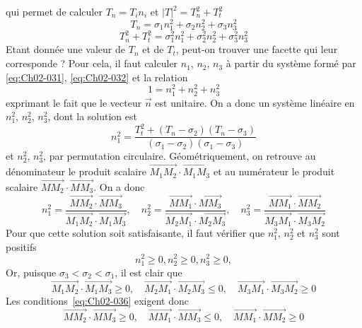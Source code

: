 qui permet de calculer $T_n = T_i n_i$ et $|T|^2 = T_n^2 + T_t^2$
\begin{equation}
    T_n = \sigma_1 n_1^2 + \sigma_2 n_2^2 + \sigma_3 n_3^2
    \label{eq:Ch02-031}
\end{equation}
\begin{equation}
    T_n^2 + T_t^2 = \sigma_1^2 n_1^2 + \sigma_2^2 n_2^2 + \sigma_3^2 n_3^2
    \label{eq:Ch02-032}
\end{equation}
Etant donnée une valeur de $T_n$ et de $T_t$, peut-on trouver une facette qui leur corresponde ?
Pour cela, il faut calculer $n_1$, $n_2$, $n_3$ à partir du système formé par \eqref{eq:Ch02-031}, \eqref{eq:Ch02-032} et la relation 
\begin{equation}
    1 = n_1^2 + n_2^2 + n_3^2
    \label{eq:Ch02-033}
\end{equation}
exprimant le fait que le vecteur $\vec{n}$ est unitaire.
On a donc un système linéaire en $n_1^2$, $n_2^2$, $n_3^2$, dont la solution est 
\begin{equation}
    n_1^2 = \frac{T_t^2 + \left( T_n - \sigma_2 \right)\left( T_n - \sigma_3 \right)}{\left( \sigma_1 - \sigma_2 \right)\left( \sigma_1 - \sigma_3 \right)}
    \label{eq:Ch02-034}
\end{equation}
et $n_2^2$, $n_3^2$, par permutation circulaire.
Géométriquement, on retrouve au dénominateur le produit scalaire $\vec{M_1M_2}\cdot\vec{M_1M_3}$ et au numérateur le produit scalaire $\vec{MM_2}\cdot \vec{MM_3}$.
On a donc 
\begin{equation}
    n_1^2 = \frac{\vec{MM_2} \cdot \vec{MM_3}}{\vec{M_1M_2} \cdot \vec{M_1M_3}},\quad n_2^2 = \frac{\vec{MM_1} \cdot \vec{MM_3}}{\vec{M_2M_1} \cdot \vec{M_2M_3}},\quad n_3^2 = \frac{\vec{MM_1} \cdot \vec{MM_2}}{\vec{M_3M_1} \cdot \vec{M_3M_2}}
    \label{eq:Ch02-035}
\end{equation}
Pour que cette solution soit satisfaisante, il faut vérifier que $n_1^2$, $n_2^2$ et $n_3^2$ sont positifs 
\begin{equation}
    n_1^2 \geq 0, n_2^2 \geq 0, n_3^2 \geq 0, 
    \label{eq:Ch02-036}
\end{equation}
Or, puisque $\sigma_3 < \sigma_2 < \sigma_1$, il est clair que
\begin{equation}
    \vec{M_1M_2} \cdot \vec{M_1M_3} \geq 0, \quad \vec{M_2M_1} \cdot \vec{M_2M_3} \leq 0, \quad \vec{M_3M_1} \cdot \vec{M_3M_2} \geq 0
    \label{eq:Ch02-037}
\end{equation}
Les conditions~\eqref{eq:Ch02-036} exigent donc 
\begin{equation}
    \vec{MM_2} \cdot \vec{MM_3} \geq 0, \quad \vec{MM_1} \cdot \vec{MM_3} \leq 0, \quad \vec{MM_1} \cdot \vec{MM_2} \geq 0
    \label{eq:Ch02-038}
\end{equation}
